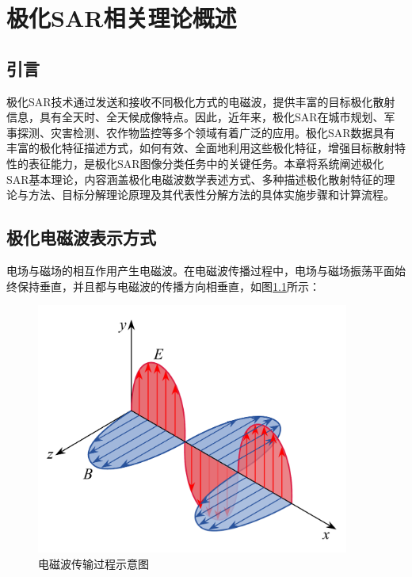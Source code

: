 \chapter{极化SAR相关理论概述}
\section{引言}
极化SAR技术通过发送和接收不同极化方式的电磁波，提供丰富的目标极化散射信息，具有全天时、全天候成像特点。因此，近年来，极化SAR在城市规划、军事探测、灾害检测、农作物监控等多个领域有着广泛的应用。极化SAR数据具有丰富的极化特征描述方式，如何有效、全面地利用这些极化特征，增强目标散射特性的表征能力，是极化SAR图像分类任务中的关键任务。本章将系统阐述极化SAR基本理论，内容涵盖极化电磁波数学表述方式、多种描述极化散射特征的理论与方法、目标分解理论原理及其代表性分解方法的具体实施步骤和计算流程。



\section{极化电磁波表示方式}
电场与磁场的相互作用产生电磁波。在电磁波传播过程中，电场与磁场振荡平面始终保持垂直，并且都与电磁波的传播方向相垂直，如图\ref{电磁波传输过程示意图}所示：

\begin{figure}[h]
  \includegraphics[width=10.3cm]{pic/chapter2/电磁波传输过程.pdf}
  \caption{电磁波传输过程示意图}
  \label{电磁波传输过程示意图}
\end{figure}

